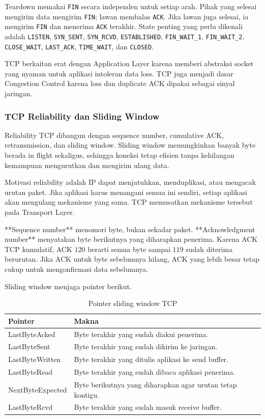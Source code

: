 Teardown memakai \texttt{FIN} secara independen untuk setiap arah. Pihak yang selesai mengirim data mengirim \texttt{FIN}; lawan membalas \texttt{ACK}. Jika lawan juga selesai, ia mengirim \texttt{FIN} dan menerima \texttt{ACK} terakhir. State penting yang perlu dikenali adalah \texttt{LISTEN}, \texttt{SYN\_SENT}, \texttt{SYN\_RCVD}, \texttt{ESTABLISHED}, \texttt{FIN\_WAIT\_1}, \texttt{FIN\_WAIT\_2}, \texttt{CLOSE\_WAIT}, \texttt{LAST\_ACK}, \texttt{TIME\_WAIT}, dan \texttt{CLOSED}.

TCP berkaitan erat dengan Application Layer karena memberi abstraksi socket yang nyaman untuk aplikasi intoleran data loss. TCP juga menjadi dasar Congestion Control karena loss dan duplicate ACK dipakai sebagai sinyal jaringan.

\subsubsection{TCP Reliability dan Sliding Window}
\begin{jawab}
Reliability TCP dibangun dengan sequence number, cumulative ACK, retransmission, dan sliding window. Sliding window memungkinkan banyak byte berada in flight sekaligus, sehingga koneksi tetap efisien tanpa kehilangan kemampuan mengurutkan dan mengirim ulang data.
\end{jawab}

Motivasi reliability adalah IP dapat menjatuhkan, menduplikasi, atau mengacak urutan paket. Jika aplikasi harus menangani semua ini sendiri, setiap aplikasi akan mengulang mekanisme yang sama. TCP memusatkan mekanisme tersebut pada Transport Layer.

**Sequence number** menomori byte, bukan sekadar paket. **Acknowledgment number** menyatakan byte berikutnya yang diharapkan penerima. Karena ACK TCP kumulatif, ACK $120$ berarti semua byte sampai $119$ sudah diterima berurutan. Jika ACK untuk byte sebelumnya hilang, ACK yang lebih besar tetap cukup untuk mengonfirmasi data sebelumnya.

Sliding window menjaga pointer berikut.

\begin{table}[H]
\centering
\begin{tabularx}{\textwidth}{|L{0.30\textwidth}|X|}
\hline
\textbf{Pointer} & \textbf{Makna} \\
\hline
LastByteAcked & Byte terakhir yang sudah diakui penerima. \\
\hline
LastByteSent & Byte terakhir yang sudah dikirim ke jaringan. \\
\hline
LastByteWritten & Byte terakhir yang ditulis aplikasi ke send buffer. \\
\hline
LastByteRead & Byte terakhir yang sudah dibaca aplikasi penerima. \\
\hline
NextByteExpected & Byte berikutnya yang diharapkan agar urutan tetap kontigu. \\
\hline
LastByteRcvd & Byte terakhir yang sudah masuk receive buffer. \\
\hline
\end{tabularx}
\caption{Pointer sliding window TCP}
\label{tab:tcp-window-pointer}
\end{table}

